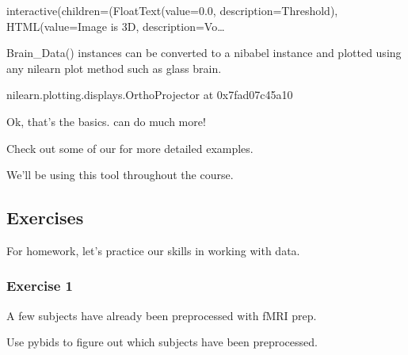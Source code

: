 \documentclass[letterpaper,10pt,english]{sphinxmanual}
\begin{document}
\begin{sphinxVerbatim}[commandchars=\\\{\}]
interactive(children=(FloatText(value=0.0, description=\PYGZsq{}Threshold\PYGZsq{}), HTML(value=\PYGZsq{}Image is 3D\PYGZsq{}, description=\PYGZsq{}Vo…
\end{sphinxVerbatim}

Brain\_Data() instances can be converted to a nibabel instance and plotted using any nilearn plot method such as glass brain.

\begin{sphinxVerbatim}[commandchars=\\\{\}]
\end{sphinxVerbatim}

\begin{sphinxVerbatim}[commandchars=\\\{\}]
\PYGZlt{}nilearn.plotting.displays.OrthoProjector at 0x7fad07c45a10\PYGZgt{}
\end{sphinxVerbatim}

\noindent{}

Ok, that’s the basics.  can do much more!

Check out some of our  for more detailed examples.

We’ll be using this tool throughout the course.


\subsection{Exercises}
\label{\detokenize{content/Introduction_to_Neuroimaging_Data:exercises}}
For homework, let’s practice our skills in working with data.


\subsubsection{Exercise 1}
\label{\detokenize{content/Introduction_to_Neuroimaging_Data:exercise-1}}
A few subjects have already been preprocessed with fMRI prep.

Use pybids to figure out which subjects have been preprocessed.
\end{document}
